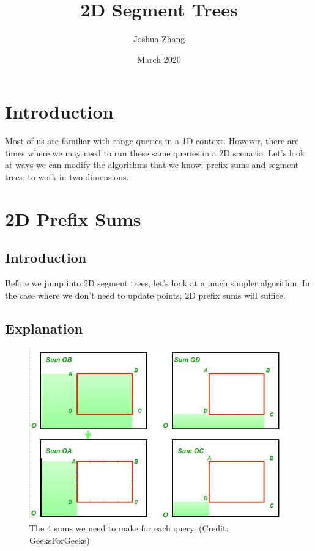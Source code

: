\documentclass{article}
\title{2D Segment Trees}
\author{Joshua Zhang}
\date{March 2020}
\begin{document}
\maketitle

\section{Introduction}
    \hspace*{1em} \quad Most of us are familiar with range queries in a 1D context. However, there are times where we may need to run these same queries in a 2D scenario. Let's look at ways we can modify the algorithms that we know: prefix sums and segment trees, to work in two dimensions.
    
\section{2D Prefix Sums}
    \subsection{Introduction}
    \hspace{1em} \quad Before we jump into 2D segment trees, let's look at a much simpler algorithm. In the case where we don't need to update points, 2D prefix sums will suffice.
    
    \subsection{Explanation}
    \begin{figure}[h]
        \centering
        \includegraphics[scale = 0.45]{Images/image1.jpeg}
        \caption{The 4 sums we need to make for each query, (Credit: GeeksForGeeks)}
    \end{figure}
    
\end{document}
